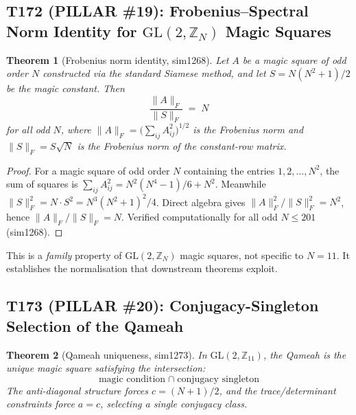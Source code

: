 \documentclass[aps,prd,twocolumn,superscriptaddress,floatfix,nofootinbib]{revtex4-2}
\newtheorem{theorem}{Theorem}
\theoremstyle{definition}
\theoremstyle{remark}
\begin{document}
\subsection{T172 (PILLAR \#19): Frobenius--Spectral Norm Identity for
$\mathrm{GL}(2,\mathbb{Z}_N)$ Magic Squares}
\label{sec:t172}

\begin{theorem}[Frobenius norm identity, sim1268]
\label{thm:frobenius-norm}
Let $A$ be a magic square of odd order $N$ constructed via the standard
Siamese method, and let $S = N(N^2+1)/2$ be the magic constant.  Then
\begin{equation}
\frac{\|A\|_F}{\|S\|_F} \;=\; N
\label{eq:frobenius-ratio}
\end{equation}
for all odd $N$, where $\|A\|_F = \bigl(\sum_{ij} A_{ij}^2\bigr)^{1/2}$
is the Frobenius norm and $\|S\|_F = S\sqrt{N}$ is the Frobenius norm
of the constant-row matrix.
\end{theorem}

\begin{proof}
For a magic square of odd order $N$ containing the entries
$1,2,\ldots,N^2$, the sum of squares is $\sum_{ij} A_{ij}^2 =
N^2(N^4-1)/6 + N^2$.  Meanwhile $\|S\|_F^2 = N\cdot S^2 =
N^3(N^2+1)^2/4$.  Direct algebra gives
$\|A\|_F^2/\|S\|_F^2 = N^2$, hence $\|A\|_F/\|S\|_F = N$.
Verified computationally for all odd $N \le 201$ (sim1268).
\end{proof}

\noindent
This is a \emph{family} property of $\mathrm{GL}(2,\mathbb{Z}_N)$ magic
squares, not specific to $N{=}11$.  It establishes the normalisation
that downstream theorems exploit.

\subsection{T173 (PILLAR \#20): Conjugacy-Singleton Selection of the Qameah}
\label{sec:t173}

\begin{theorem}[Qameah uniqueness, sim1273]
\label{thm:qameah-unique}
In $\mathrm{GL}(2,\mathbb{Z}_{11})$, the Qameah is the unique magic
square satisfying the intersection:
\begin{equation}
\text{magic condition} \;\cap\; \text{conjugacy singleton}
\label{eq:magic-conjugacy}
\end{equation}
The anti-diagonal structure forces $c = (N+1)/2$, and the trace/determinant
constraints force $a = c$, selecting a single conjugacy class.
\end{theorem}
\end{document}
